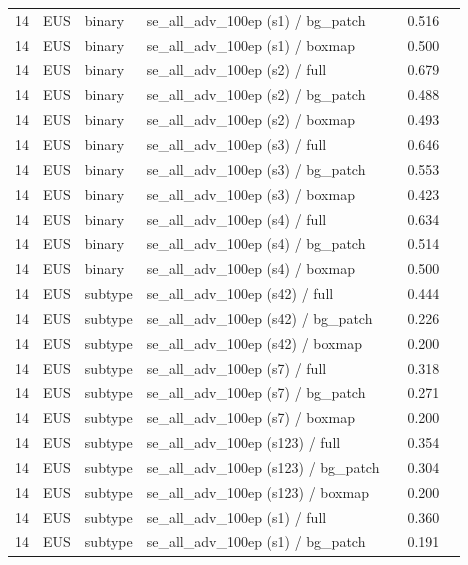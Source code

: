 \begin{longtable}{cL{1.1cm}L{1.5cm}L{5.6cm}ccc}
14 & EUS & binary & se\_all\_adv\_100ep (s1) / bg\_patch & \nl{} & 0.516 & \nl{} \\
14 & EUS & binary & se\_all\_adv\_100ep (s1) / boxmap & \nl{} & 0.500 & \nl{} \\
14 & EUS & binary & se\_all\_adv\_100ep (s2) / full & \nl{} & 0.679 & \nl{} \\
14 & EUS & binary & se\_all\_adv\_100ep (s2) / bg\_patch & \nl{} & 0.488 & \nl{} \\
14 & EUS & binary & se\_all\_adv\_100ep (s2) / boxmap & \nl{} & 0.493 & \nl{} \\
14 & EUS & binary & se\_all\_adv\_100ep (s3) / full & \nl{} & 0.646 & \nl{} \\
14 & EUS & binary & se\_all\_adv\_100ep (s3) / bg\_patch & \nl{} & 0.553 & \nl{} \\
14 & EUS & binary & se\_all\_adv\_100ep (s3) / boxmap & \nl{} & 0.423 & \nl{} \\
14 & EUS & binary & se\_all\_adv\_100ep (s4) / full & \nl{} & 0.634 & \nl{} \\
14 & EUS & binary & se\_all\_adv\_100ep (s4) / bg\_patch & \nl{} & 0.514 & \nl{} \\
14 & EUS & binary & se\_all\_adv\_100ep (s4) / boxmap & \nl{} & 0.500 & \nl{} \\
14 & EUS & subtype & se\_all\_adv\_100ep (s42) / full & \nl{} & 0.444 & \nl{} \\
14 & EUS & subtype & se\_all\_adv\_100ep (s42) / bg\_patch & \nl{} & 0.226 & \nl{} \\
14 & EUS & subtype & se\_all\_adv\_100ep (s42) / boxmap & \nl{} & 0.200 & \nl{} \\
14 & EUS & subtype & se\_all\_adv\_100ep (s7) / full & \nl{} & 0.318 & \nl{} \\
14 & EUS & subtype & se\_all\_adv\_100ep (s7) / bg\_patch & \nl{} & 0.271 & \nl{} \\
14 & EUS & subtype & se\_all\_adv\_100ep (s7) / boxmap & \nl{} & 0.200 & \nl{} \\
14 & EUS & subtype & se\_all\_adv\_100ep (s123) / full & \nl{} & 0.354 & \nl{} \\
14 & EUS & subtype & se\_all\_adv\_100ep (s123) / bg\_patch & \nl{} & 0.304 & \nl{} \\
14 & EUS & subtype & se\_all\_adv\_100ep (s123) / boxmap & \nl{} & 0.200 & \nl{} \\
14 & EUS & subtype & se\_all\_adv\_100ep (s1) / full & \nl{} & 0.360 & \nl{} \\
14 & EUS & subtype & se\_all\_adv\_100ep (s1) / bg\_patch & \nl{} & 0.191 & \nl{} \\

\end{longtable}
